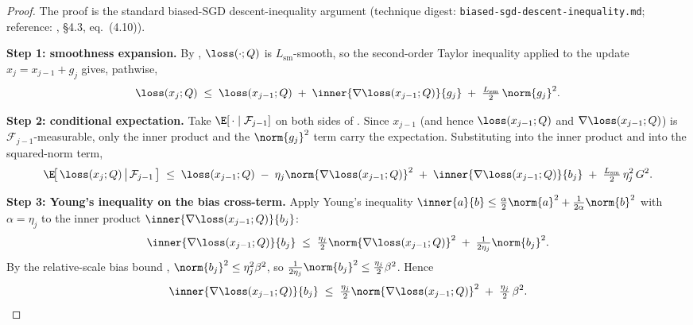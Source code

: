 \begin{proof}
The proof is the standard biased-SGD descent-inequality argument
(technique digest: \texttt{biased-sgd-descent-inequality.md};
reference: \cite{bottou2018optimization}, \S 4.3, eq.~(4.10)).

\noindent\textbf{Step 1: smoothness expansion.}
By , $\loss(\cdot; Q)$ is $L_{\mathrm{sm}}$-smooth,
so the second-order Taylor inequality applied to the update
$x_j = x_{j-1} + g_j$ gives, pathwise,
\begin{align}\label{eq:descent_smoothness_step}
   \loss(x_j; Q)
   \;\le\;
   \loss(x_{j-1}; Q)
   \;+\; \inner{\nabla \loss(x_{j-1}; Q)}{g_j}
   \;+\; \tfrac{L_{\mathrm{sm}}}{2}\, \norm{g_j}^2.
\end{align}

\noindent\textbf{Step 2: conditional expectation.}
Take $\E[\,\cdot \mid \mathcal F_{j-1}]$ on both sides of
. Since $x_{j-1}$ (and hence
$\loss(x_{j-1}; Q)$ and $\nabla \loss(x_{j-1}; Q)$) is
$\mathcal F_{j-1}$-measurable, only the inner product and the
$\norm{g_j}^2$ term carry the expectation. Substituting
 into the inner product and
 into the squared-norm term,
\begin{align*}
   \E\!\bigl[\, \loss(x_j; Q) \,\big|\, \mathcal F_{j-1} \,\bigr]
   \;\le\;
   \loss(x_{j-1}; Q)
   \;-\; \eta_j \norm{\nabla \loss(x_{j-1}; Q)}^2
   \;+\; \inner{\nabla \loss(x_{j-1}; Q)}{b_j}
   \;+\; \tfrac{L_{\mathrm{sm}}}{2}\, \eta_j^2\, G^2.
\end{align*}

\noindent\textbf{Step 3: Young's inequality on the bias cross-term.}
Apply Young's inequality
$\inner{a}{b} \le \tfrac{\alpha}{2} \norm{a}^2 + \tfrac{1}{2 \alpha} \norm{b}^2$
with $\alpha = \eta_j$ to the inner product
$\inner{\nabla \loss(x_{j-1}; Q)}{b_j}$:
\begin{align*}
   \inner{\nabla \loss(x_{j-1}; Q)}{b_j}
   \;\le\;
   \tfrac{\eta_j}{2} \norm{\nabla \loss(x_{j-1}; Q)}^2
   \;+\; \tfrac{1}{2 \eta_j} \norm{b_j}^2.
\end{align*}
By the relative-scale bias bound ,
$\norm{b_j}^2 \le \eta_j^2 \beta^2$, so
$\tfrac{1}{2 \eta_j} \norm{b_j}^2 \le \tfrac{\eta_j}{2} \beta^2$. Hence
\begin{align*}
   \inner{\nabla \loss(x_{j-1}; Q)}{b_j}
   \;\le\;
   \tfrac{\eta_j}{2} \norm{\nabla \loss(x_{j-1}; Q)}^2
   \;+\; \tfrac{\eta_j}{2}\, \beta^2.
\end{align*}


\end{proof}
